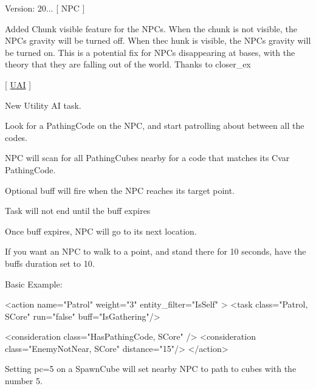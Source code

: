 Version\+: 20... \mbox{[} NPC \mbox{]}
\begin{DoxyItemize}
\item Added Chunk visible feature for the NPCs. When the chunk is not visible, the NPC\textquotesingle{}s gravity will be turned off. When thec hunk is visible, the NPC\textquotesingle{}s gravity will be turned on. This is a potential fix for NPCs disappearing at bases, with the theory that they are falling out of the world. Thanks to closer\+\_\+ex
\end{DoxyItemize}

\mbox{[} \mbox{\hyperlink{namespace_u_a_i}{UAI}} \mbox{]}
\begin{DoxyItemize}
\item New Utility AI task.
\begin{DoxyItemize}
\item Look for a Pathing\+Code on the NPC, and start patrolling about between all the codes.
\item NPC will scan for all Pathing\+Cubes nearby for a code that matches its Cvar Pathing\+Code.
\item Optional buff will fire when the NPC reaches its target point.
\begin{DoxyItemize}
\item Task will not end until the buff expires
\item Once buff expires, NPC will go to its next location.
\item If you want an NPC to walk to a point, and stand there for 10 seconds, have the buff\textquotesingle{}s duration set to 10.
\end{DoxyItemize}
\end{DoxyItemize}
\end{DoxyItemize}

\begin{DoxyVerb}        Basic Example:

        <action name="Patrol" weight="3" entity_filter="IsSelf" >
            <task class="Patrol, SCore" run="false" buff="IsGathering"/>

            <consideration class="HasPathingCode, SCore" />
            <consideration class="EnemyNotNear, SCore" distance="15"/>
        </action>

        Setting pc=5 on a SpawnCube will set nearby NPC to path to cubes with the number 5.
\end{DoxyVerb}


